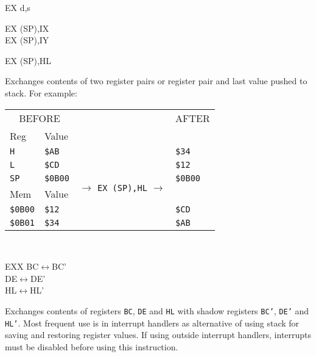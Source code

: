 \documentclass[twoside,openright,a4paper]{book}
\begin{document}
\begin{basedescript}{
	\desclabelstyle{\multilinelabel}
	\desclabelwidth{3cm}}
\begin{detailitem}{EX d,s}
\begin{DetailVariants}
			\columnbreak
			EX (SP),IX\\
			EX (SP),IY
			
			\columnbreak
			EX (SP),HL
		\end{DetailVariants}

		Exchanges contents of two register pairs or register pair and last value pushed to stack. For example:

		\begin{tabular}{llcl}
			\multicolumn{2}{c}{BEFORE} & & AFTER \\[5pt]
			Reg & \multicolumn{3}{l}{Value} \\[5pt]
			{\tt H} & {\tt \$AB} & \multirow{6}{*}{$\rightarrow$ {\tt EX (SP),HL} $\rightarrow$} & {\tt \$34}\\
			{\tt L} & {\tt \$CD} & & {\tt \$12}\\
			{\tt SP} & {\tt \$0B00} & & {\tt \$0B00}\\[5pt]
			Mem & Value \\[5pt]
			{\tt \$0B00} & {\tt \$12} & & {\tt \$CD}\\
			{\tt \$0B01} & {\tt \$34} & & {\tt \$AB}\\
		\end{tabular}\\[5pt] %

		\DetailNoEffect
						
		\begin{DetailTiming}
		\end{DetailTiming}

	\end{detailitem}

	\begin{detailitem}{EXX}
		{BC$\leftrightarrow$BC'\\
		DE$\leftrightarrow$DE'\\
		HL$\leftrightarrow$HL'}

		Exchanges contents of registers {\tt BC}, {\tt DE} and {\tt HL} with shadow registers {\tt BC'}, {\tt DE'} and {\tt HL'}. Most frequent use is in interrupt handlers as alternative of using stack for saving and restoring register values. If using outside interrupt handlers, interrupts must be disabled before using this instruction.

		\DetailNoEffect
				
		\begin{DetailTiming}
			\DetailTime{}{1}{4}
		\end{DetailTiming}


\end{detailitem}
\end{basedescript}
\end{document}

